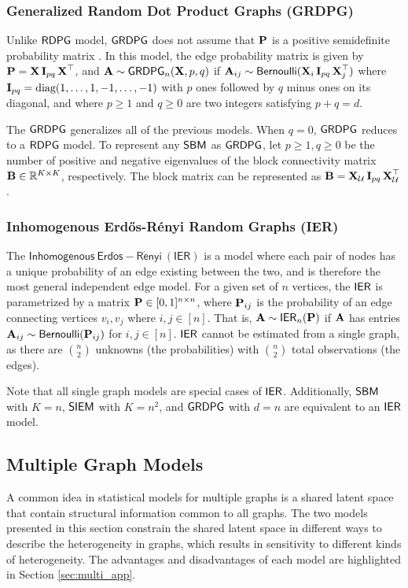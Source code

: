 \subsubsection{Generalized Random Dot Product Graphs (GRDPG)}\label{sec:grdpg}
Unlike $\operatorname{\mathsf{RDPG}}$ model, $\operatorname{\mathsf{GRDPG}}$ does not assume that $\operatorname{\mathbf{P}}$ is a positive semidefinite probability matrix  \cite{rubin2017statistical}. In this model, the edge probability matrix is given by $\operatorname{\mathbf{P}}=\operatorname{\mathbf{X}} \operatorname{\mathbf{I}}_{pq}\operatorname{\mathbf{X}}^\top$, and $\operatorname{\mathbf{A}}\sim\operatorname{\mathsf{GRDPG}}_n(
\operatorname{\mathbf{X}}, p, q)$ if $\operatorname{\mathbf{A}}_{ij}\sim\operatorname{\mathsf{Bernoulli}}(\operatorname{\mathbf{X}}_i\operatorname{\mathbf{I}}_{pq}\operatorname{\mathbf{X}}_j^\top)$ where $\operatorname{\mathbf{I}}_{pq}=\textrm{diag}(1, \ldots, 1, -1, \ldots, -1)$  with $p$ ones followed by $q$ minus ones on its diagonal, and where $p \geq 1$ and $q \geq 0$ are two integers satisfying $p + q = d$.

The $\operatorname{\mathsf{GRDPG}}$ generalizes all of the previous models. When $q=0$, $\operatorname{\mathsf{GRDPG}}$ reduces to a $\operatorname{\mathsf{RDPG}}$ model. To represent any $\operatorname{\mathsf{SBM}}$ as $\operatorname{\mathsf{GRDPG}}$, let $p\geq 1, q\geq 0$ be the number of positive and negative eigenvalues of the block connectivity matrix $\operatorname{\mathbf{B}}\in\mathbb{R}^{K\times K}$, respectively. The block matrix can be represented as $\operatorname{\mathbf{B}} = \operatorname{\mathbf{X}}_\mathcal{U}\operatorname{\mathbf{I}}_{pq}\operatorname{\mathbf{X}}_\mathcal{U}^\top$.

\subsubsection{Inhomogenous Erd\H os-R\'enyi Random Graphs (IER)}\label{sec:uierrg}
The $\mathsf{Inhomogenous~Erd\ddot{o}s-R\acute{e}nyi~(IER)}$ is a model where each pair of nodes has a unique probability of an edge existing between the two, and is therefore the most general independent edge model. For a given set of $n$ vertices, the $\operatorname{\mathsf{IER}}$ is parametrized by a matrix $\operatorname{\mathbf{P}} \in [0, 1]^{n \times n}$, where $\operatorname{\mathbf{P}}_{ij}$ is the probability of an edge connecting vertices $v_i, v_j$ where $i, j \in [n]$. That is, $\operatorname{\mathbf{A}} \sim \operatorname{\mathsf{IER}}_n(\operatorname{\mathbf{P}})$ if $\operatorname{\mathbf{A}}$ has entries $\operatorname{\mathbf{A}}_{ij}\sim \operatorname{\mathsf{Bernoulli}}(\operatorname{\mathbf{P}}_{ij})$ for $i, j \in [n]$. $\operatorname{\mathsf{IER}}$ cannot be estimated from a single graph, as there are $n\choose 2$ unknowns (the probabilities) with $n\choose 2$ total observations (the edges).

Note that all single graph models are special cases of $\operatorname{\mathsf{IER}}$. Additionally, $\operatorname{\mathsf{SBM}}$ with $K=n$, $\operatorname{\mathsf{SIEM}}$ with $K=n^2$, and $\operatorname{\mathsf{GRDPG}}$ with $d=n$ are equivalent to an $\operatorname{\mathsf{IER}}$ model.

\subsection{Multiple Graph Models}\label{sec:multi_graph_models}
A common idea in statistical models for multiple graphs is a shared latent space that contain structural information common to all graphs. The two models presented in this section constrain the shared latent space in different ways to describe the heterogeneity in graphs, which results in sensitivity to different kinds of heterogeneity. The advantages and disadvantages of each model are highlighted in Section \ref{sec:multi_app}.


